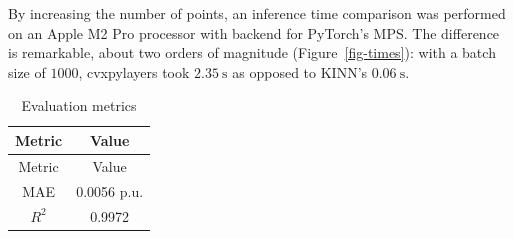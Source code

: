 \documentclass[
]{article}
\begin{document}
By increasing the number of points, an inference time comparison was
performed on an Apple M2 Pro processor with backend for PyTorch's MPS.
The difference is remarkable, about two orders of magnitude
(Figure~\ref{fig-times}): with a batch size of \(1000\), cvxpylayers
took \(2.35~\textrm{s}\) as opposed to KINN's \(0.06~\textrm{s}\).

\begin{longtable}[]{@{}cc@{}}
\caption{Evaluation metrics}\label{tbl-eval}\tabularnewline
\toprule\noalign{}
Metric & Value \\
\midrule\noalign{}
\endfirsthead
\toprule\noalign{}
Metric & Value \\
\midrule\noalign{}
\endhead
\bottomrule\noalign{}
\endlastfoot
MAE & 0.0056 p.u. \\
\(R^{2}\) & 0.9972 \\
\end{longtable}
\end{document}

